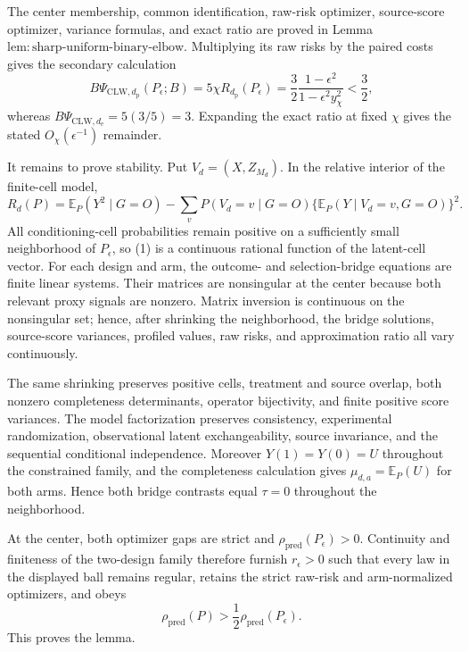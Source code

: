 The center membership, common identification, raw-risk optimizer, source-score optimizer, variance formulas, and exact ratio are proved in Lemma~\(\mathrm{lem{:}sharp\text{-}uniform\text{-}binary\text{-}elbow}\). Multiplying its raw risks by the paired costs gives the secondary calculation
\[
 B\Psi_{\mathrm{CLW},d_{\mathrm p}}(P_\epsilon;B)
 =5\chi R_{d_{\mathrm p}}(P_\epsilon)
 =\frac32\frac{1-\epsilon^2}{1-\epsilon^2y_\chi^2}<\frac32,
\]
whereas \(B\Psi_{\mathrm{CLW},d_{\mathrm e}}=5(3/5)=3\). Expanding the exact ratio at fixed \(\chi\) gives the stated \(O_\chi(\epsilon^{-1})\) remainder.

It remains to prove stability. Put \(V_d=(X,Z_{M_d})\). In the relative interior of the finite-cell model,
\[
 R_d(P)=\mathbb E_P(Y^2\mid G=O)
 -\sum_v P(V_d=v\mid G=O)
 \{\mathbb E_P(Y\mid V_d=v,G=O)\}^2. \tag{1}
\]
All conditioning-cell probabilities remain positive on a sufficiently small neighborhood of \(P_\epsilon\), so (1) is a continuous rational function of the latent-cell vector. For each design and arm, the outcome- and selection-bridge equations are finite linear systems. Their matrices are nonsingular at the center because both relevant proxy signals are nonzero. Matrix inversion is continuous on the nonsingular set; hence, after shrinking the neighborhood, the bridge solutions, source-score variances, profiled values, raw risks, and approximation ratio all vary continuously.

The same shrinking preserves positive cells, treatment and source overlap, both nonzero completeness determinants, operator bijectivity, and finite positive score variances. The model factorization preserves consistency, experimental randomization, observational latent exchangeability, source invariance, and the sequential conditional independence. Moreover \(Y(1)=Y(0)=U\) throughout the constrained family, and the completeness calculation gives \(\mu_{d,a}=\mathbb E_P(U)\) for both arms. Hence both bridge contrasts equal \(\tau=0\) throughout the neighborhood.

At the center, both optimizer gaps are strict and \(\rho_{\mathrm{pred}}(P_\epsilon)>0\). Continuity and finiteness of the two-design family therefore furnish \(r_\epsilon>0\) such that every law in the displayed ball remains regular, retains the strict raw-risk and arm-normalized optimizers, and obeys
\[
 \rho_{\mathrm{pred}}(P)>\frac12\rho_{\mathrm{pred}}(P_\epsilon).
\]
This proves the lemma.